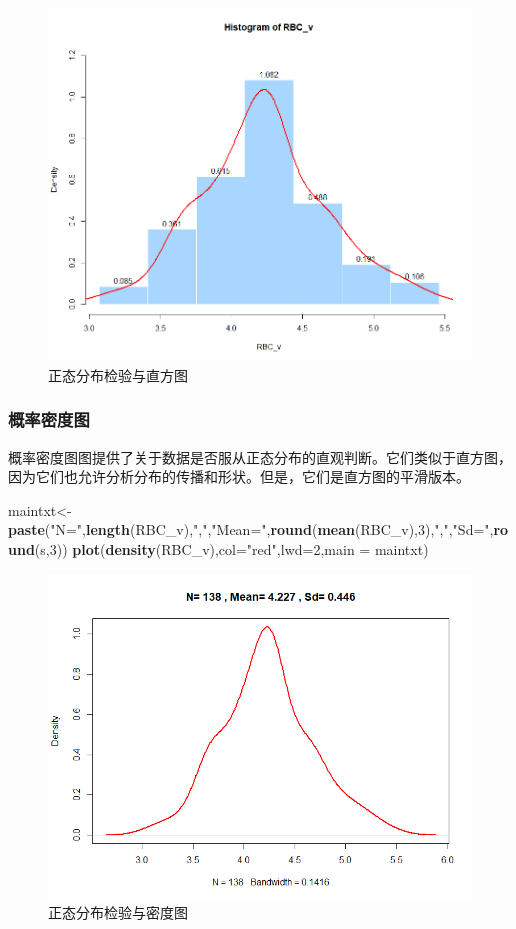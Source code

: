\documentclass[
]{article}
\newenvironment{Shaded}{\begin{snugshade}}{\end{snugshade}}
\newcommand{\DataTypeTok}[1]{\textcolor[rgb]{0.13,0.29,0.53}{#1}}
\newcommand{\DecValTok}[1]{\textcolor[rgb]{0.00,0.00,0.81}{#1}}
\newcommand{\KeywordTok}[1]{\textcolor[rgb]{0.13,0.29,0.53}{\textbf{#1}}}
\newcommand{\NormalTok}[1]{#1}
\newcommand{\StringTok}[1]{\textcolor[rgb]{0.31,0.60,0.02}{#1}}
\begin{document}
\begin{figure}

{\centering \includegraphics[width=0.49\linewidth,height=0.49\textheight]{image/5ba23e818daa7c71b147707f9b5dfd6} 

}

\caption{正态分布检验与直方图}\label{fig:histtest}
\end{figure}

\hypertarget{ux6982ux7387ux5bc6ux5ea6ux56fe}{%
\subsubsection{概率密度图}\label{ux6982ux7387ux5bc6ux5ea6ux56fe}}

概率密度图图提供了关于数据是否服从正态分布的直观判断。它们类似于直方图，因为它们也允许分析分布的传播和形状。但是，它们是直方图的平滑版本。

\begin{Shaded}
\begin{Highlighting}[]
\NormalTok{maintxt<-}\KeywordTok{paste}\NormalTok{(}\StringTok{"N="}\NormalTok{,}\KeywordTok{length}\NormalTok{(RBC_v),}\StringTok{","}\NormalTok{,}\StringTok{"Mean="}\NormalTok{,}\KeywordTok{round}\NormalTok{(}\KeywordTok{mean}\NormalTok{(RBC_v),}\DecValTok{3}\NormalTok{),}\StringTok{","}\NormalTok{,}\StringTok{"Sd="}\NormalTok{,}\KeywordTok{round}\NormalTok{(s,}\DecValTok{3}\NormalTok{))}
\KeywordTok{plot}\NormalTok{(}\KeywordTok{density}\NormalTok{(RBC_v),}\DataTypeTok{col=}\StringTok{"red"}\NormalTok{,}\DataTypeTok{lwd=}\DecValTok{2}\NormalTok{,}\DataTypeTok{main =}\NormalTok{ maintxt)}
\end{Highlighting}
\end{Shaded}

\begin{figure}

{\centering \includegraphics[width=0.49\linewidth,height=0.49\textheight]{image/Densitytest} 

}

\caption{正态分布检验与密度图}\label{fig:densitytest}
\end{figure}
\end{document}
